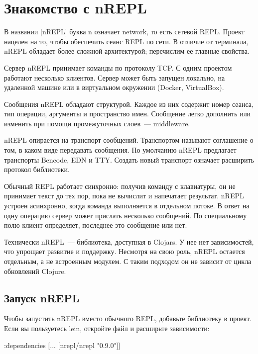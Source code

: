 \section{Знакомство с nREPL}

\def\urlnreplorg{https://nrepl.org}

В названии \footurl{nREPL}{\urlnreplorg}[nREPL] буква n означает network, то есть сетевой REPL. Проект нацелен на то, чтобы обеспечить сеанс REPL по сети. В отличие от терминала, nREPL обладает более сложной архитектурой; перечислим ее главные свойства.

Сервер nREPL принимает команды по протоколу TCP. С одним проектом работают несколько клиентов. Сервер может быть запущен локально, на удаленной машине или в виртуальном окружении (Docker, VirtualBox).

Сообщения nREPL обладают структурой. Каждое из них содержит номер сеанса, тип операции, аргументы и пространство имен. Сообщение легко дополнить или изменить при помощи промежуточных слоев~--- middleware.

nREPL опирается на транспорт сообщений. Транспортом называют соглашение о том, в каком виде передавать сообщения. По умолчанию nREPL предлагает транспорты Bencode, EDN и TTY. Создать новый транспорт означает расширить протокол библиотеки.

Обычный REPL работает синхронно: получив команду с клавиатуры, он не принимает текст до тех пор, пока не вычислит и напечатает результат. nREPL устроен асинхронно, когда команда выполняется в отдельном потоке. В ответ на одну операцию сервер может прислать несколько сообщений. По специальному полю клиент определяет, последнее это сообщение или нет.

Технически nREPL~--- библиотека, доступная в Clojars. У нее нет зависимостей, что упрощает развитие и поддержку. Несмотря на свою роль, nREPL остается отдельным, а не встроенным модулем. С таким подходом он не зависит от цикла обновлений Clojure.

\subsection{Запуск nREPL}

Чтобы запустить nREPL вместо обычного REPL, добавьте библиотеку в проект. Если вы пользуетесь lein, откройте файл  и расширьте зависимости:

\begin{english}
  \begin{clojure}
{:dependencies
 [... [nrepl/nrepl "0.9.0"]]}
  \end{clojure}
\end{english}


